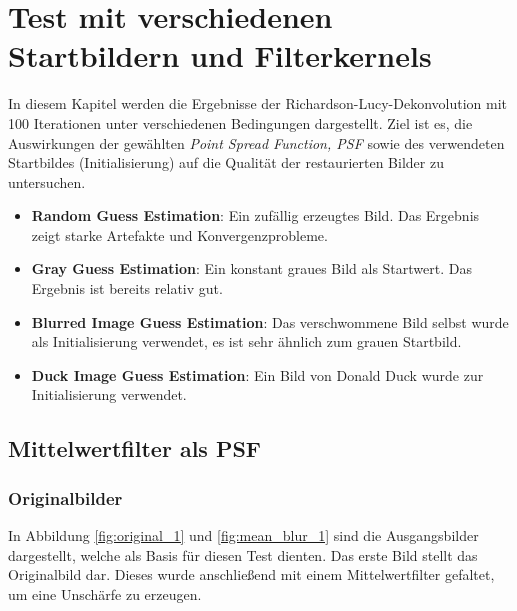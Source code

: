 \section{Test mit verschiedenen Startbildern und Filterkernels}

In diesem Kapitel werden die Ergebnisse der Richardson-Lucy-Dekonvolution mit 100 Iterationen unter verschiedenen Bedingungen dargestellt. Ziel ist es, die Auswirkungen der gewählten \textit{Point Spread Function, PSF} sowie des verwendeten Startbildes (Initialisierung) auf die Qualität der restaurierten Bilder zu untersuchen.

\begin{itemize}
    \item \textbf{Random Guess Estimation}: Ein zufällig erzeugtes Bild. Das Ergebnis zeigt starke Artefakte und Konvergenzprobleme.
    \item \textbf{Gray Guess Estimation}: Ein konstant graues Bild als Startwert. Das Ergebnis ist bereits relativ gut.
    \item \textbf{Blurred Image Guess Estimation}: Das verschwommene Bild selbst wurde als Initialisierung verwendet, es ist sehr ähnlich zum grauen Startbild.
    \item \textbf{Duck Image Guess Estimation}: Ein Bild von Donald Duck wurde zur Initialisierung verwendet.
\end{itemize}


\subsection{Mittelwertfilter als PSF}

\subsubsection{Originalbilder}

In Abbildung \ref{fig:original_1} und \ref{fig:mean_blur_1} sind die Ausgangsbilder dargestellt, welche als Basis für diesen Test dienten. Das erste Bild stellt das Originalbild dar. Dieses wurde anschließend mit einem Mittelwertfilter gefaltet, um eine Unschärfe zu erzeugen.

\noindent
\begin{minipage}[t]{0.5\textwidth}
\end{minipage}
%
\begin{minipage}[t]{0.5\textwidth}
\end{minipage}

